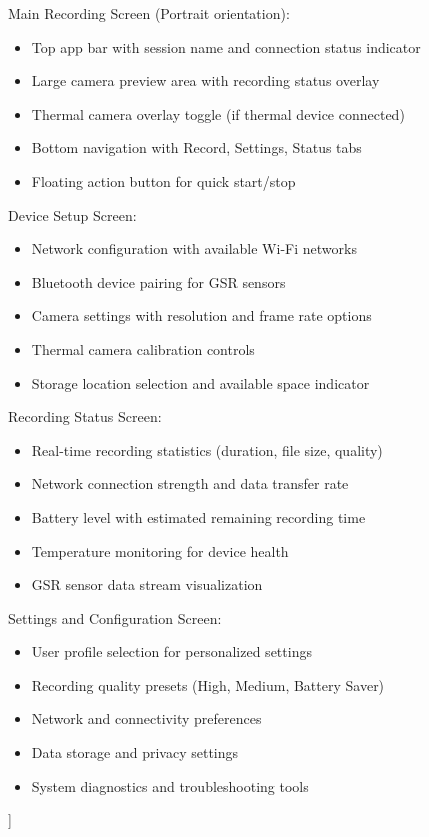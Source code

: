 \documentclass[12pt,a4paper]{report}
\begin{document}
Main Recording Screen (Portrait orientation):
\begin{itemize}
\item Top app bar with session name and connection status indicator
\item Large camera preview area with recording status overlay
\item Thermal camera overlay toggle (if thermal device connected)
\item Bottom navigation with Record, Settings, Status tabs
\item Floating action button for quick start/stop

\end{itemize}
Device Setup Screen:
\begin{itemize}
\item Network configuration with available Wi-Fi networks
\item Bluetooth device pairing for GSR sensors
\item Camera settings with resolution and frame rate options
\item Thermal camera calibration controls
\item Storage location selection and available space indicator

\end{itemize}
Recording Status Screen:
\begin{itemize}
\item Real-time recording statistics (duration, file size, quality)
\item Network connection strength and data transfer rate
\item Battery level with estimated remaining recording time
\item Temperature monitoring for device health
\item GSR sensor data stream visualization

\end{itemize}
Settings and Configuration Screen:
\begin{itemize}
\item User profile selection for personalized settings
\item Recording quality presets (High, Medium, Battery Saver)
\item Network and connectivity preferences
\item Data storage and privacy settings
\item System diagnostics and troubleshooting tools
\end{itemize}
]
\end{document}
